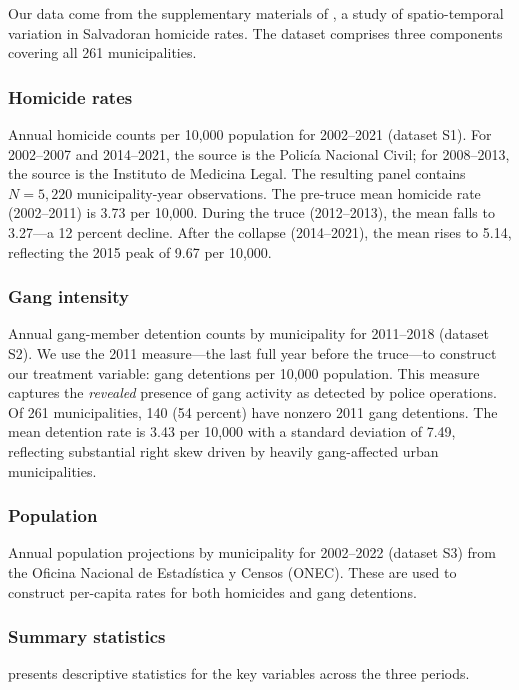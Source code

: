 \documentclass[12pt]{article}
\begin{document}
Our data come from the supplementary materials of \citet{plosone2024}, a study of spatio-temporal variation in Salvadoran homicide rates. The dataset comprises three components covering all 261 municipalities.

\subsubsection*{Homicide rates} Annual homicide counts per 10,000 population for 2002--2021 (dataset S1). For 2002--2007 and 2014--2021, the source is the Polic\'ia Nacional Civil; for 2008--2013, the source is the Instituto de Medicina Legal. The resulting panel contains $N = 5{,}220$ municipality-year observations. The pre-truce mean homicide rate (2002--2011) is 3.73 per 10,000. During the truce (2012--2013), the mean falls to 3.27---a 12 percent decline. After the collapse (2014--2021), the mean rises to 5.14, reflecting the 2015 peak of 9.67 per 10,000.

\subsubsection*{Gang intensity} Annual gang-member detention counts by municipality for 2011--2018 (dataset S2). We use the 2011 measure---the last full year before the truce---to construct our treatment variable: gang detentions per 10,000 population. This measure captures the \textit{revealed} presence of gang activity as detected by police operations. Of 261 municipalities, 140 (54 percent) have nonzero 2011 gang detentions. The mean detention rate is 3.43 per 10,000 with a standard deviation of 7.49, reflecting substantial right skew driven by heavily gang-affected urban municipalities.

\subsubsection*{Population} Annual population projections by municipality for 2002--2022 (dataset S3) from the Oficina Nacional de Estad\'istica y Censos (ONEC). These are used to construct per-capita rates for both homicides and gang detentions.

\subsubsection*{Summary statistics}  presents descriptive statistics for the key variables across the three periods.
\end{document}
